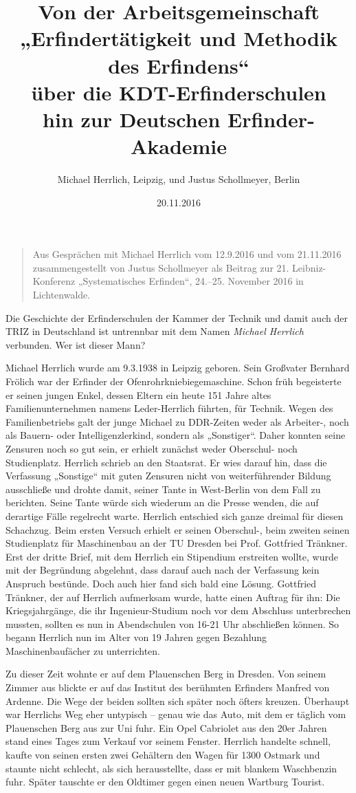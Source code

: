 \documentclass[11pt,a4paper]{article}
\title{Von der Arbeitsgemeinschaft\\ „Erfindertätigkeit und Methodik des
  Erfindens“\\ über die KDT-Erfinderschulen\\ hin zur Deutschen
  Erfinder-Akademie}
\author{Michael Herrlich, Leipzig, und Justus Schollmeyer, Berlin}
\date{20.11.2016}
\begin{document}
\maketitle
\begin{quote}
  Aus Gesprächen mit Michael Herrlich vom 12.9.2016 und vom 21.11.2016
  zusammengestellt von Justus Schollmeyer als Beitrag zur
  21. Leibniz-Konferenz „Systematisches Erfinden“, 24.--25. November 2016 in
  Lichtenwalde.
\end{quote}

Die Geschichte der Erfinderschulen der Kammer der Technik und damit auch der
TRIZ in Deutschland ist untrennbar mit dem Namen \emph{Michael Herrlich}
verbunden.  Wer ist dieser Mann?

Michael Herrlich wurde am 9.3.1938 in Leipzig geboren. Sein Großvater Bernhard
Frölich war der Erfinder der Ofenrohrkniebiegemaschine. Schon früh begeisterte
er seinen jungen Enkel, dessen Eltern ein heute 151 Jahre altes
Familienunternehmen namens Leder-Herrlich führten, für Technik. Wegen des
Familienbetriebs galt der junge Michael zu DDR-Zeiten weder als Arbeiter-,
noch als Bauern- oder Intelligenzlerkind, sondern als „Sonstiger“. Daher
konnten seine Zensuren noch so gut sein, er erhielt zunächst weder Oberschul-
noch Studienplatz. Herrlich schrieb an den Staatsrat. Er wies darauf hin, dass
die Verfassung „Sonstige“ mit guten Zensuren nicht von weiterführender Bildung
ausschließe und drohte damit, seiner Tante in West-Berlin von dem Fall zu
berichten.  Seine Tante würde sich wiederum an die Presse wenden, die auf
derartige Fälle regelrecht warte. Herrlich entschied sich ganze dreimal für
diesen Schachzug. Beim ersten Versuch erhielt er seinen Oberschul-, beim
zweiten seinen Studienplatz für Maschinenbau an der TU Dresden bei
Prof. Gottfried Tränkner. Erst der dritte Brief, mit dem Herrlich ein
Stipendium erstreiten wollte, wurde mit der Begründung abgelehnt, dass darauf
auch nach der Verfassung kein Anspruch bestünde. Doch auch hier fand sich bald
eine Lösung. Gottfried Tränkner, der auf Herrlich aufmerksam wurde, hatte
einen Auftrag für ihn: Die Kriegsjahrgänge, die ihr Ingenieur-Studium noch vor
dem Abschluss unterbrechen mussten, sollten es nun in Abendschulen von 16-21
Uhr abschließen können. So begann Herrlich nun im Alter von 19 Jahren gegen
Bezahlung Maschinenbaufächer zu unterrichten.

Zu dieser Zeit wohnte er auf dem Plauenschen Berg in Dresden. Von seinem
Zimmer aus blickte er auf das Institut des berühmten Erfinders Manfred von
Ardenne. Die Wege der beiden sollten sich später noch öfters kreuzen.
Überhaupt war Herrlichs Weg eher untypisch – genau wie das Auto, mit dem er
täglich vom Plauenschen Berg aus zur Uni fuhr. Ein Opel Cabriolet aus den 20er
Jahren stand eines Tages zum Verkauf vor seinem Fenster. Herrlich handelte
schnell, kaufte von seinen ersten zwei Gehältern den Wagen für 1300 Ostmark
und staunte nicht schlecht, als sich herausstellte, dass er mit blankem
Waschbenzin fuhr. Später tauschte er den Oldtimer gegen einen neuen Wartburg
Tourist.
\end{document}
